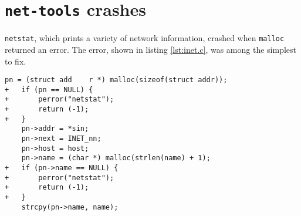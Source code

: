 \section{\texttt{net-tools} crashes}
\label{appendix:net-tools}

\texttt{netstat}, which prints a variety of network information, crashed when \texttt{malloc} returned an error. The error, shown in listing \ref{lst:inet.c}, was among the simplest to fix.

\begin{lstlisting}[label={lst:inet.c},firstnumber=213, caption={\texttt{lib/inet.c}}]
    pn = (struct add	r *) malloc(sizeof(struct addr));
+   if (pn == NULL) {
+   	perror("netstat");
+		return (-1);
+   }
    pn->addr = *sin;
    pn->next = INET_nn;
    pn->host = host;
    pn->name = (char *) malloc(strlen(name) + 1);
+   if (pn->name == NULL) {
+   	perror("netstat");
+		return (-1);
+   }
    strcpy(pn->name, name);
\end{lstlisting}
